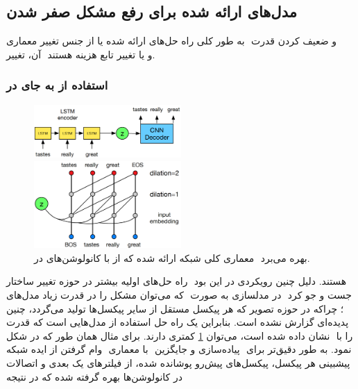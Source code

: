 \subsection{مدل‌های ارائه شده برای رفع مشکل صفر شدن }
به طور کلی راه حل‌های ارائه شده یا از جنس تغییر معماری ‎\decoder{}‎ و ضعیف کردن قدرت ‎\autoregressive{}‎ آن، تغییر ‎\priordist{}‎ و یا تغییر تابع هزینه هستند.
\\
\subsubsection{استفاده از \cnn{} به جای \lstm{} در \decoder{}}
\begin{figure}[h]
	\centering
	\includegraphics[width=0.5\textwidth]{images/dialated-conv1.png}

	\vspace{0.5cm}

	\includegraphics[width=0.5\textwidth]{images/dialated-conv2.png}
	\caption{
		معماری کلی شبکه ارائه شده که از \cnn{}  با کانولوشن‌های \dilated{} در  ‎\decoder{}‎ بهره می‌برد.
	}
	\label{fig:dialted_conv}
\end{figure}
راه حل‌های اولیه بیشتر در حوزه تغییر ساختار ‎\decoder{}‎ هستند. دلیل چنین رویکردی در این بود که می‌توان مشکل را در قدرت زیاد مدل‌های ‎\lstm{} در مدلسازی به صورت ‎\autoregressive{}‎ جست و جو کرد \cite{vae_dialated}؛ چراکه در حوزه تصویر که هر پیکسل مستقل از سایر پیکسل‌ها تولید می‌گردد، چنین پدیده‌ای گزارش نشده است. بنابراین یک راه حل استفاده از مدل‌هایی است که قدرت \autoregressive{} کمتری دارند. برای مثال همان طور که در شکل ‎\ref{fig:dialted_conv}‎ نشان داده شده است، می‌توان ‎\decoder{}‎ را با وام گرفتن از ایده شبکه ‎‎ با معماری ‎\cnn{}‎ پیاده‌سازی و جایگزین ‎\lstm{}‎ نمود. به طور دقیق‌تر برای پیشبینی هر پیکسل، پیکسل‌های پیش‌رو پوشانده شده، از فیلتر‌های یک بعدی و اتصالات
در کانولوشن‌ها بهره گرفته شده که در نتیجه
